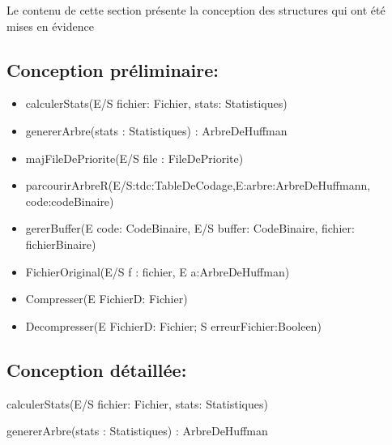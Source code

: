 Le contenu de cette section présente la conception des structures qui ont été mises en évidence
\subsection*{Conception préliminaire:}
\begin{itemize}[label=$\ $, leftmargin=2cm]
    \item calculerStats(E/S fichier: Fichier, stats: Statistiques) 
    \item genererArbre(stats : Statistiques) : ArbreDeHuffman 
    \item majFileDePriorite(E/S file : FileDePriorite) 
    \item parcourirArbreR(E/S:tdc:TableDeCodage,E:arbre:ArbreDeHuffmann, code:codeBinaire) 
    \item gererBuffer(E code: CodeBinaire, E/S buffer: CodeBinaire, fichier: fichierBinaire) 
    \item FichierOriginal(E/S f : fichier, E a:ArbreDeHuffman) 
    \item Compresser(E FichierD: Fichier) 
    \item Decompresser(E FichierD: Fichier; S erreurFichier:Booleen)
\end{itemize}

\subsection*{Conception détaillée:}
\begin{procedure}
    \SetAlgoLined
    \caption{calculerStats(E/S fichier: Fichier, stats: Statistiques)}
\end{procedure}


\begin{function}
    \SetAlgoLined
    \caption{genererArbre(stats : Statistiques) : ArbreDeHuffman}
\end{function}

